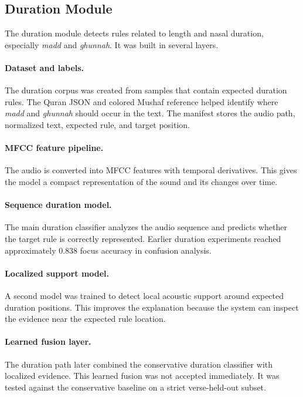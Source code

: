 \subsection{Duration Module}

The duration module detects rules related to length and nasal duration,
especially \textit{madd} and \textit{ghunnah}. It was built in several layers.

\paragraph{Dataset and labels.}
The duration corpus was created from samples that contain expected duration
rules. The Quran JSON and colored Mushaf reference helped identify where
\textit{madd} and \textit{ghunnah} should occur in the text. The manifest stores
the audio path, normalized text, expected rule, and target position.

\paragraph{MFCC feature pipeline.}
The audio is converted into MFCC features with temporal derivatives. This gives
the model a compact representation of the sound and its changes over time.

\paragraph{Sequence duration model.}
The main duration classifier analyzes the audio sequence and predicts whether
the target rule is correctly represented. Earlier duration experiments reached
approximately 0.838 focus accuracy in confusion analysis.

\paragraph{Localized support model.}
A second model was trained to detect local acoustic support around expected
duration positions. This improves the explanation because the system can inspect
the evidence near the expected rule location.

\paragraph{Learned fusion layer.}
The duration path later combined the conservative duration classifier with
localized evidence. This learned fusion was not accepted immediately. It was
tested against the conservative baseline on a strict verse-held-out subset.

